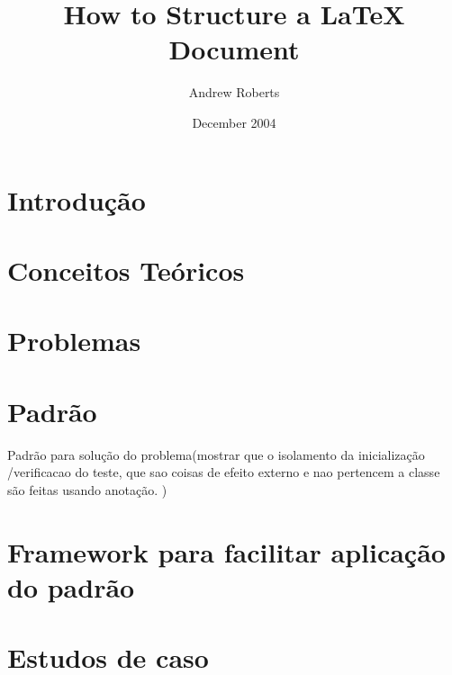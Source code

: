 \documentclass[12pt,a4paper,oneside]{book}
\begin{document}
\title{How to Structure a LaTeX Document}
\author{Andrew Roberts}
\date{December 2004}
\maketitle


\chapter{Introdução}

\chapter{Conceitos Teóricos}

\chapter{Problemas}


\chapter{Padrão}

Padrão para solução do problema(mostrar que o isolamento da inicialização /verificacao do teste, que sao coisas de efeito externo e nao pertencem a classe são feitas  usando anotação. )

\chapter{Framework para facilitar aplicação do padrão}

\chapter{Estudos de caso}
\end{document}
